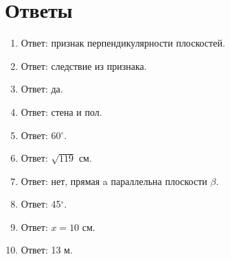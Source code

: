 \documentclass{umk-matematika}
\begin{document}
\section*{Ответы}

\begin{enumerate}
  \item Ответ: признак перпендикулярности плоскостей.
  \item Ответ: следствие из признака.
  \item Ответ: да.
  \item Ответ: стена и пол.
  \item Ответ: 60$^\circ$.
  \item Ответ: $\sqrt{119}$ см.
  \item Ответ: нет, прямая a параллельна плоскости $\beta$.
  \item Ответ: 45$^\circ$.
  \item Ответ: $x = 10$ см.
  \item Ответ: 13 м.
\end{enumerate}
\end{document}

